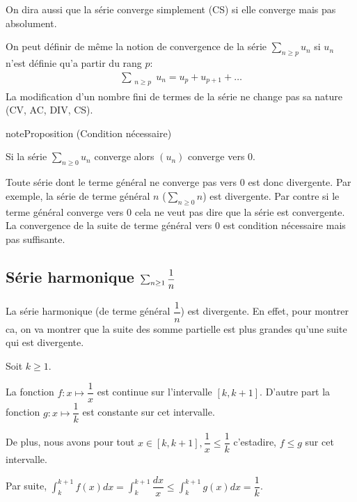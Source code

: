 \documentclass[letterpaper,10pt,french]{sphinxmanual}
\begin{document}
\sphinxAtStartPar
On dira aussi que la série converge simplement (CS) si elle converge mais pas absolument.

\sphinxAtStartPar
On peut définir de même la notion de convergence de la série \(\sum_{n\geq p} u_n\) si \(u_n\) n’est définie qu’a partir du rang \(p\):
\begin{equation*}
\begin{split}
\sum_{\substack{n\geq p}} u_n = u_p + u_{p+1}+ \ldots 
\end{split}
\end{equation*}
\sphinxAtStartPar
La modification d’un nombre fini de termes de la série ne change pas sa nature (CV, AC, DIV, CS).

\begin{sphinxadmonition}{note}{Proposition (Condition nécessaire)}

\sphinxAtStartPar
Si la série \(\sum_{n\geq 0}u_n\) converge alors \((u_n)\) converge vers 0.
\end{sphinxadmonition}

\sphinxAtStartPar
Toute série dont le terme général ne converge pas vers 0 est donc divergente. Par exemple, la série de terme général \(n\) (\(\sum_{n\geq 0}n\)) est divergente. Par contre si le terme général converge vers 0 cela ne veut pas dire que la série est convergente. La convergence de la suite de terme général vers 0 est condition nécessaire mais pas suffisante.


\subsection{Série harmonique \protect\(\sum_{n\geq 1} \dfrac{1}{n}\protect\)}
\label{\detokenize{series:serie-harmonique-sum-n-geq-1-dfrac-1-n}}
\sphinxAtStartPar
La série harmonique (de terme général \(\dfrac{1}{n}\)) est divergente. En effet, pour montrer ca, on va montrer que la suite des somme partielle est plus grandes qu’une suite qui est divergente.

\sphinxAtStartPar
Soit \(k\geq 1\).

\sphinxAtStartPar
La fonction \(f: x\mapsto \dfrac{1}{x}\) est continue sur l’intervalle \([k, k+1]\). D’autre part la fonction \(g: x\mapsto \dfrac{1}{k}\) est constante sur cet intervalle.

\sphinxAtStartPar
De plus, nous avons pour tout \(x\in [k, k+1], \dfrac{1}{x}\leq \dfrac{1}{k}\) c’est\sphinxhyphen{}a\sphinxhyphen{}dire, \(f\leq g\) sur cet intervalle.

\sphinxAtStartPar
Par suite, \(\int_k^{k+1}f(x)dx= \int_k^{k+1}\dfrac{dx}{x} \leq \int_k^{k+1} g(x)dx = \dfrac{1}{k}\).
\end{document}

